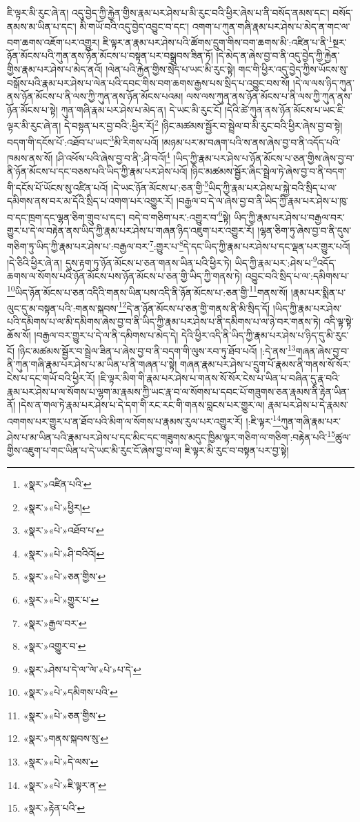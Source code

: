 ཇི་ལྟར་མི་རུང་ཞེ་ན། འདུ་བྱེད་ཀྱི་རྐྱེན་གྱིས་རྣམ་པར་ཤེས་པ་མི་རུང་བའི་ཕྱིར་ཞེས་པ་ནི་བསོད་ནམས་དང་། བསོད་ནམས་མ་ཡིན་པ་དང་། མི་གཡོ་བའི་འདུ་བྱེད་འབྱུང་བ་དང་། འགག་པ་ཀུན་གཞི་རྣམ་པར་ཤེས་པ་མེད་ན་གང་ལ་བག་ཆགས་འཇོག་པར་འགྱུར། ཇི་ལྟར་ན་རྣམ་པར་ཤེས་པའི་ཚོགས་དྲུག་གིས་བག་ཆགས་མི་:འཛིན་པ་ནི་\footnote{«སྣར་»འཛིན་པའི་}སྔར་ཉོན་མོངས་པའི་ཀུན་ནས་ཉོན་མོངས་པ་བསྟན་པར་བསྒྲུབས་ཟིན་ཏོ། །དེ་མེད་ན་ཞེས་བྱ་བ་ནི་འདུ་བྱེད་ཀྱི་རྐྱེན་གྱིས་རྣམ་པར་ཤེས་པ་མེད་ནའོ། །ལེན་པའི་རྐྱེན་གྱིས་སྲེད་པ་ཡང་མི་རུང་སྟེ། གང་གི་ཕྱིར་འདུ་བྱེད་ཀྱིས་ཡོངས་སུ་བསྒོས་པའི་རྣམ་པར་ཤེས་པ་ལེན་པའི་དབང་གིས་བག་ཆགས་རྒྱས་པས་སྲིད་པ་འབྱུང་བས་སོ། །དེ་ལ་ལས་ཉིད་ཀུན་ནས་ཉོན་མོངས་པ་ནི་ལས་ཀྱི་ཀུན་ནས་ཉོན་མོངས་པའམ། ལས་ལས་ཀུན་ནས་ཉོན་མོངས་པ་ནི་ལས་ཀྱི་ཀུན་ནས་ཉོན་མོངས་པ་སྟེ། ཀུན་གཞི་རྣམ་པར་ཤེས་པ་མེད་ན། དེ་ཡང་མི་རུང་ངོ། །དེའི་ཚེ་ཀུན་ནས་ཉོན་མོངས་པ་ཡང་ཇི་ལྟར་མི་རུང་ཞེ་ན། དེ་བསྟན་པར་བྱ་བའི་:ཕྱིར་རོ།\footnote{«སྣར་»«པེ་»ཕྱིར།} །ཉིང་མཚམས་སྦྱོར་བ་སྦྲེལ་བ་མི་རུང་བའི་ཕྱིར་ཞེས་བྱ་བ་སྟེ། བདག་གི་དངོས་པོ་:འཐོབ་པ་ཡང་\footnote{«སྣར་»«པེ་»འཐོབ་པ་}མི་རིགས་པའོ། །མཉམ་པར་མ་བཞག་པའི་ས་ནས་ཞེས་བྱ་བ་ནི་འདོད་པའི་ཁམས་ནས་སོ། །ཤི་འཕོས་པའི་ཞེས་བྱ་བ་ནི་:ཤི་བའོ།\footnote{«སྣར་»«པེ་»ཤི་བའིའོ།} །ཡིད་ཀྱི་རྣམ་པར་ཤེས་པ་ཉོན་མོངས་པ་ཅན་གྱིས་ཞེས་བྱ་བ་ནི་ཉོན་མོངས་པ་དང་བཅས་པའི་ཡིད་ཀྱི་རྣམ་པར་ཤེས་པའོ། །ཉིང་མཚམས་སྦྱོར་ཞིང་སྦྲེལ་ཏེ་ཞེས་བྱ་བ་ནི་བདག་གི་དངོས་པོ་ཡོངས་སུ་འཛིན་པའོ། །དེ་ཡང་ཉོན་མོངས་པ་:ཅན་གྱི་\footnote{«སྣར་»«པེ་»ཅན་གྱིས་}ཡིད་ཀྱི་རྣམ་པར་ཤེས་པ་སྐྱེ་བའི་སྲིད་པ་ལ་དམིགས་ནས་བར་མ་དོའི་སྲིད་པ་འགག་པར་འགྱུར་རོ། །བརྒྱལ་བ་དེ་ལ་ཞེས་བྱ་བ་ནི་ཡིད་ཀྱི་རྣམ་པར་ཤེས་པ་ཁུ་བ་དང་ཁྲག་དང་ལྷན་ཅིག་གྲུབ་པ་དང་། བདེ་བ་གཅིག་པར་:འགྱུར་བ་\footnote{«སྣར་»«པེ་»གྱུར་པ་}སྟེ། ཡིད་ཀྱི་རྣམ་པར་ཤེས་པ་བརྒྱལ་བར་གྱུར་པ་དེ་ལ་བརྟེན་ནས་ཡིད་ཀྱི་རྣམ་པར་ཤེས་པ་གཞན་ཉིད་འཇུག་པར་འགྱུར་རོ། །ལྷན་ཅིག་ཏུ་ཞེས་བྱ་བ་ནི་དུས་གཅིག་ཏུ་ཡིད་ཀྱི་རྣམ་པར་ཤེས་པ་:བརྒྱལ་བར་\footnote{«སྣར་»རྒྱལ་བར་}:གྱུར་པ་\footnote{«སྣར་»འགྱུར་བ་}དེ་དང་ཡིད་ཀྱི་རྣམ་པར་ཤེས་པ་དང་ལྡན་པར་གྱུར་པའོ། །དེ་ཅིའི་ཕྱིར་ཞེ་ན། དུས་རྟག་ཏུ་ཉོན་མོངས་པ་ཅན་གནས་ཡིན་པའི་ཕྱིར་ཏེ། ཡིད་ཀྱི་རྣམ་པར་:ཤེས་པ་\footnote{«སྣར་»ཤེས་པ་དེ་ལ་ེ་ལ་«པེ་»པ་དེ་}འདོད་ཆགས་ལ་སོགས་པའི་ཉོན་མོངས་པས་ཉོན་མོངས་པ་ཅན་གྱི་ཡིད་ཀྱི་གནས་ཏེ། འབྱུང་བའི་སྲིད་པ་ལ་:དམིགས་པ་\footnote{«སྣར་»«པེ་»དམིགས་པའི་}ཡིད་ཉོན་མོངས་པ་ཅན་འདིའི་གནས་ཡིན་པས་འདི་ནི་ཉོན་མོངས་པ་:ཅན་གྱི་\footnote{«སྣར་»«པེ་»ཅན་གྱིས་}གནས་སོ། །རྣམ་པར་སྨིན་པ་ལུང་དུ་མ་བསྟན་པའི་:གནས་སྐབས་\footnote{«སྣར་»གནས་སྐབས་སུ་}དེ་ན་ཉོན་མོངས་པ་ཅན་གྱི་གནས་ནི་མི་སྲིད་དོ། །ཡིད་ཀྱི་རྣམ་པར་ཤེས་པའི་དམིགས་པ་ལ་མི་དམིགས་ཞེས་བྱ་བ་ནི་ཡིད་ཀྱི་རྣམ་པར་ཤེས་པ་ནི་དམིགས་པ་ལ་ཉེ་བར་གནས་ཏེ། འདི་ལྟ་སྟེ་ཆོས་སོ། །བརྒྱལ་བར་གྱུར་པ་དེ་ལ་ནི་དམིགས་པ་མེད་དེ། དེའི་ཕྱིར་འདི་ནི་ཡིད་ཀྱི་རྣམ་པར་ཤེས་པ་ཉིད་དུ་མི་རུང་ངོ། །ཉིང་མཚམས་སྦྱོར་བ་སྦྲེལ་ཟིན་པ་ཞེས་བྱ་བ་ནི་བདག་གི་ལུས་རབ་ཏུ་ཐོབ་པའོ། །:དེ་ནས་\footnote{«སྣར་»«པེ་»དེ་ལས་}གཞན་ཞེས་བྱ་བ་ནི་ཀུན་གཞི་རྣམ་པར་ཤེས་པ་མ་ཡིན་པ་ནི་གཞན་པ་སྟེ། གཞན་རྣམ་པར་ཤེས་པ་དྲུག་པོ་རྣམས་ནི་གནས་སོ་སོར་ངེས་པ་དང་གཡོ་བའི་ཕྱིར་རོ། །ཇི་ལྟར་མིག་གི་རྣམ་པར་ཤེས་པ་གནས་སོ་སོར་ངེས་པ་ཡིན་པ་བཞིན་དུ་རྣ་བའི་རྣམ་པར་ཤེས་པ་ལ་སོགས་པ་ལྷག་མ་རྣམས་ཀྱི་ཡང་རྣ་བ་ལ་སོགས་པ་དབང་པོ་གཟུགས་ཅན་རྣམས་ནི་རྟེན་ཡིན་ནོ། །དེས་ན་གལ་ཏེ་རྣམ་པར་ཤེས་པ་དེ་དག་གི་རང་རང་གི་གནས་བླངས་པར་གྱུར་ལ། རྣམ་པར་ཤེས་པ་དེ་རྣམས་འགགས་པར་གྱུར་པ་ན་ཐོབ་པའི་མིག་ལ་སོགས་པ་རྣམས་རུལ་པར་འགྱུར་རོ། །:ཇི་ལྟར་\footnote{«སྣར་»«པེ་»ཇི་ལྟར་ན་}ཀུན་གཞི་རྣམ་པར་ཤེས་པ་མ་ཡིན་པའི་རྣམ་པར་ཤེས་པ་དང་མིང་དང་གཟུགས་མདུང་ཁྱིམ་ལྟར་གཅིག་ལ་གཅིག་:བརྟེན་པའི་\footnote{«སྣར་»རྟེན་པའི་}ཚུལ་གྱིས་འཇུག་པ་གང་ཡིན་པ་དེ་ཡང་མི་རུང་ངོ་ཞེས་བྱ་བ་ལ། ཇི་ལྟར་མི་རུང་བ་བསྟན་པར་བྱ་སྟེ། 